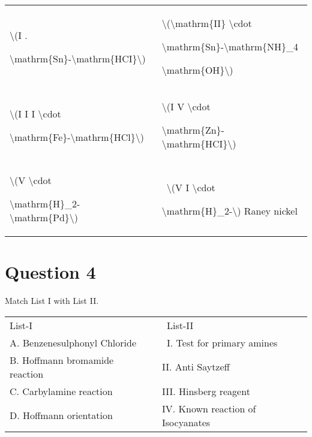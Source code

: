 \documentclass{article}
\begin{document}
\begin{longtable}[]{@{}ll@{}}

\toprule\noalign{}

\endhead

\bottomrule\noalign{}

\endlastfoot

\textbackslash(I .

\textbackslash mathrm\{Sn\}-\textbackslash mathrm\{HCI\}\textbackslash)~

& \textbackslash(\textbackslash mathrm\{II\} \textbackslash cdot

\textbackslash mathrm\{Sn\}-\textbackslash mathrm\{NH\}\_4

\textbackslash mathrm\{OH\}\textbackslash)~ \\

\textbackslash(I I I \textbackslash cdot

\textbackslash mathrm\{Fe\}-\textbackslash mathrm\{HCl\}\textbackslash)~

& \textbackslash(I V \textbackslash cdot

\textbackslash mathrm\{Zn\}-\textbackslash mathrm\{HCI\}\textbackslash)~ \\

\textbackslash(V \textbackslash cdot

\textbackslash mathrm\{H\}\_2-\textbackslash mathrm\{Pd\}\textbackslash)~

& ~\textbackslash(V I \textbackslash cdot

\textbackslash mathrm\{H\}\_2-\textbackslash) Raney nickel \\

\end{longtable}


\begin{enumerate}[label=(\alph*)]
\end{enumerate}
\newpage
\section*{Question 4}
Match List I with List II.



\begin{longtable}[]{@{}ll@{}}

\toprule\noalign{}

\endhead

\bottomrule\noalign{}

\endlastfoot

List-I~~ & ~List-II~ \\

A. Benzenesulphonyl Chloride & ~I. Test for primary amines~ \\

B. Hoffmann bromamide reaction~~ & II. Anti Saytzeff~~ \\

C. Carbylamine reaction~ & III. Hinsberg reagent~ \\

D. Hoffmann orientation~ & IV. Known reaction of Isocyanates~ \\

\end{longtable}
\end{document}
